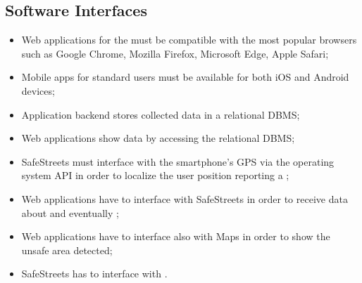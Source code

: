 \documentclass[../../../rasd.tex]{subfiles}
\begin{document}
\subsection{Software Interfaces\label{sect:3.1.3}}
\begin{itemize}
	\item Web applications for the  must be compatible with the most popular browsers such as Google Chrome, Mozilla Firefox, Microsoft Edge, Apple Safari; 
	\item Mobile apps for standard users must be available for both iOS and Android devices;
	\item Application backend stores collected data in a relational DBMS; 
	\item Web applications show data by accessing the relational DBMS; 
	\item SafeStreets must interface with the smartphone's GPS via the operating system API in order to localize the user position reporting a ;
	\item Web applications have to interface with SafeStreets in order to receive data about  and eventually ;
	\item Web applications have to interface also with Maps in order to show the unsafe area detected; 
	\item SafeStreets has to interface with .
	 
\end{itemize}
\end{document}
